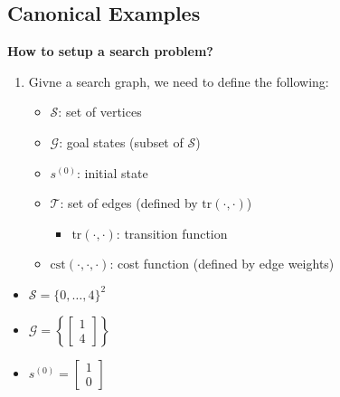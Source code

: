 \subsection{Canonical Examples}
\begin{process} \textbf{How to setup a search problem?}
    \begin{enumerate}
        \item Givne a search graph, we need to define the following:
        \begin{itemize}
            \item $\mathcal{S}$: set of vertices
            \item $\mathcal{G}$: goal states (subset of $\mathcal{S}$)
            \item $s^{(0)}$: initial state
            \item $\mathcal{T}$: set of edges (defined by $\text{tr}(\cdot, \cdot)$)
            \begin{itemize}
                \item $\text{tr}(\cdot, \cdot)$: transition function
            \end{itemize}
            \item $\text{cst}(\cdot, \cdot, \cdot)$: cost function (defined by edge weights)
        \end{itemize}
    \end{enumerate}
\end{process}

\begin{example}
\end{example}
\newpage

\begin{example}
    \begin{itemize}
        \item $\mathcal{S} = \{0,\ldots,4 \}^2$
        \item $\mathcal{G} = \left\{ \begin{bmatrix}
            1 \\
            4
        \end{bmatrix} \right\}$
        \item $s^{(0)} = \begin{bmatrix}
            1 \\
            0
        \end{bmatrix}$
    \end{itemize}
\end{example}
\newpage


